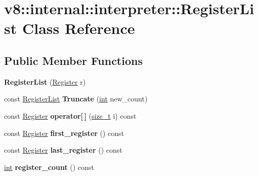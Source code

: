 \hypertarget{classv8_1_1internal_1_1interpreter_1_1RegisterList}{}\section{v8\+:\+:internal\+:\+:interpreter\+:\+:Register\+List Class Reference}
\label{classv8_1_1internal_1_1interpreter_1_1RegisterList}
\subsection*{Public Member Functions}
\begin{DoxyCompactItemize}
\item 
\mbox{\label{classv8_1_1internal_1_1interpreter_1_1RegisterList_abdda1c3d113ba095871f6717a467fbba}} 
{\bfseries Register\+List} (\mbox{\hyperlink{classv8_1_1internal_1_1interpreter_1_1Register}{Register}} r)
\item 
\mbox{\label{classv8_1_1internal_1_1interpreter_1_1RegisterList_ac7127d2f04017a96a857c304caa60f6f}} 
const \mbox{\hyperlink{classv8_1_1internal_1_1interpreter_1_1RegisterList}{Register\+List}} {\bfseries Truncate} (\mbox{\hyperlink{classint}{int}} new\+\_\+count)
\item 
\mbox{\label{classv8_1_1internal_1_1interpreter_1_1RegisterList_a861de4e256a75abd1e55fa6ccfc238e7}} 
const \mbox{\hyperlink{classv8_1_1internal_1_1interpreter_1_1Register}{Register}} {\bfseries operator\mbox{[}$\,$\mbox{]}} (\mbox{\hyperlink{classsize__t}{size\+\_\+t}} i) const
\item 
\mbox{\label{classv8_1_1internal_1_1interpreter_1_1RegisterList_a82fbb5a7cfa693f186dda2dcaeb7091c}} 
const \mbox{\hyperlink{classv8_1_1internal_1_1interpreter_1_1Register}{Register}} {\bfseries first\+\_\+register} () const
\item 
\mbox{\label{classv8_1_1internal_1_1interpreter_1_1RegisterList_ab1e096d59b7e5b9fbf268fb4dbe2123f}} 
const \mbox{\hyperlink{classv8_1_1internal_1_1interpreter_1_1Register}{Register}} {\bfseries last\+\_\+register} () const
\item 
\mbox{\label{classv8_1_1internal_1_1interpreter_1_1RegisterList_a272f083f50dc5e2bb1bccf6398250977}} 
\mbox{\hyperlink{classint}{int}} {\bfseries register\+\_\+count} () const
\end{DoxyCompactItemize}
